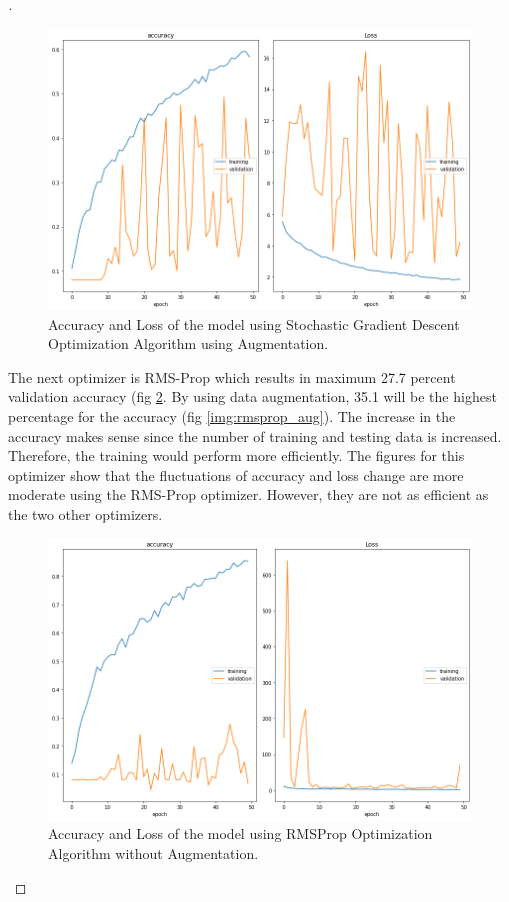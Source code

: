 \documentclass[12pt,oneside,geqno]{article}
\begin{document}
\begin{proof}[\color{red}{Solution}]
		\begin{figure}
			\centering
			\includegraphics[width=\textwidth]{../figs/sgd_aug_acc_loss.png}
			\caption{Accuracy and Loss of the model using Stochastic Gradient Descent Optimization Algorithm using Augmentation.}
			\label{img:sgd_aug}
		\end{figure}
		
		The next optimizer is RMS-Prop which results in maximum 27.7 percent validation accuracy (fig \ref{img:rmsprop}. By using data augmentation, 35.1 will be the highest percentage for the accuracy (fig \ref{img:rmsprop_aug}). The increase in the accuracy makes sense since the number of training and testing data is increased. Therefore, the training would perform more efficiently. The figures for this optimizer show that the fluctuations of accuracy and loss change are more moderate using the RMS-Prop optimizer. However, they are not as efficient as the two other optimizers.
		
		\begin{figure}
			\centering
			\includegraphics[width=\textwidth]{../figs/rmsprop_acc_loss.png}
			\caption{Accuracy and Loss of the model using RMSProp Optimization Algorithm without Augmentation.}
			\label{img:rmsprop}
		\end{figure}
		

\end{proof}
\end{document}
